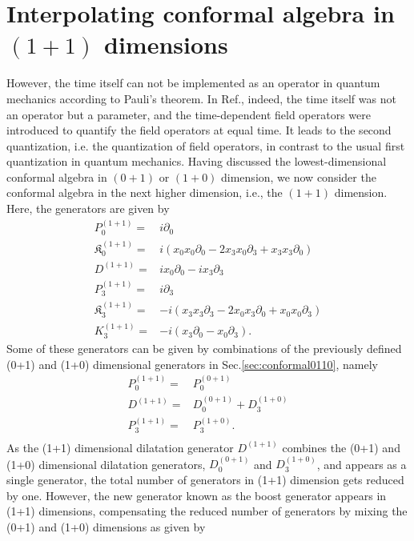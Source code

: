 \documentclass[%
 reprint,
superscriptaddress,
 amsmath,amssymb,
 aps,
]{revtex4-2}
\begin{document}
\section{Interpolating conformal algebra in \texorpdfstring{$(1+1)$}{Lg} dimensions}
\label{sec:conformal}

{\color{red} 
However, the time itself can not be implemented as an operator in quantum mechanics according to Pauli's theorem\cite{Galapon1999}. In Ref.\cite{Fubini1976}, indeed, the time itself was not an operator but a parameter, and the time-dependent field operators were introduced to quantify the field operators at equal time. It leads to the second quantization, i.e. the quantization of field operators, in contrast to the usual first quantization in quantum mechanics.}
Having discussed the lowest-dimensional conformal algebra in $(0+1)$ or $(1+0)$ dimension, we now consider the conformal algebra in the next higher dimension, i.e., the $(1+1)$ dimension. Here, the generators are given by
\begin{align}
    P^{(1+1)}_{0}=&i\partial_{0}\\
    \mathfrak{K}^{(1+1)}_{{0}}=&i(x_{0}x_{0}\partial_{{0}}-2x_{3}x_{0}\partial_{3}+x_{3}x_{3}\partial_{0})\\
    D^{(1+1)}=&ix_{0}\partial_{0}-ix_{3}\partial_{3}\\
    P^{(1+1)}_{3}=&i\partial_{3}\\
    \mathfrak{K}^{(1+1)}_{{3}}=&-i(x_{3}x_{3}\partial_{{3}}-2x_{0}x_{3}\partial_{0}+x_{0}x_{0}\partial_{3})\\
    K_{3}^{(1+1)}=&-i(x_{3}\partial_{0}-x_{0}\partial_{3}).
\end{align}
Some of these generators can be given by 
combinations of the previously defined (0+1) and (1+0) dimensional generators in Sec.\ref{sec:conformal0110}, namely
\begin{align}
    P^{(1+1)}_{0}=&P^{(0+1)}_{0}\\
    D^{(1+1)}=&D^{(0+1)}_{0}+D^{(1+0)}_{3}\\
    P^{(1+1)}_{3}=&P^{(1+0)}_{3}.\\
\end{align}
As the (1+1) dimensional dilatation generator $D^{(1+1)}$ combines the (0+1) and (1+0) dimensional dilatation generators, $D^{(0+1)}_{0}$ and $D^{(1+0)}_{3}$, and appears as a single generator, the total number of generators in (1+1) dimension gets reduced by one. 
However, the new generator known as the boost generator appears in (1+1) dimensions, compensating the reduced number of generators by mixing the (0+1) and (1+0) dimensions as given by
\end{document}
